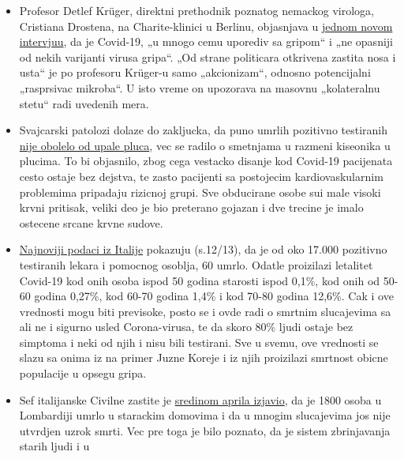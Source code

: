 \begin{itemize}
\tightlist
\item
  Profesor Detlef Krüger, direktni prethodnik poznatog nemackog
  virologa, Cristiana Drostena, na Charite-klinici u Berlinu, objasnjava
  u
  \href{https://de.sputniknews.com/interviews/20200425326953541-corona-gefahr-virologe/}{jednom
  novom intervjuu}, da je Covid-19, „u mnogo cemu uporediv sa gripom`` i
  „ne opasniji od nekih varijanti virusa gripa``. „Od strane politicara
  otkrivena zastita nosa i usta`` je po profesoru Krüger-u samo
  „akcionizam``, odnosno potencijalni „rasprsivac mikroba``. U isto
  vreme on upozorava na masovnu „kolateralnu stetu`` radi uvedenih mera.
\item
  Svajcarski patolozi dolaze do zakljucka, da puno umrlih pozitivno
  testiranih
  \href{https://www.welt.de/wissenschaft/article207417811/Corona-Tote-In-den-wenigsten-Faellen-eine-Lungenentzuendung.html}{nije
  obolelo od upale pluca}, vec se radilo o smetnjama u razmeni kiseonika
  u plucima. To bi objasnilo, zbog cega vestacko disanje kod Covid-19
  pacijenata cesto ostaje bez dejstva, te zasto pacijenti sa postojecim
  kardiovaskularnim problemima pripadaju rizicnoj grupi. Sve obducirane
  osobe sui male visoki krvni pritisak, veliki deo je bio preterano
  gojazan i dve trecine je imalo ostecene srcane krvne sudove.
\item
  \href{https://www.epicentro.iss.it/coronavirus/bollettino/Bollettino-sorveglianza-integrata-COVID-19_16-aprile-2020.pdf\#page=13}{Najnoviji
  podaci iz Italije} pokazuju (s.12/13), da je od oko 17.000 pozitivno
  testiranih lekara i pomocnog osoblja, 60 umrlo. Odatle proizilazi
  letalitet Covid-19 kod onih osoba ispod 50 godina starosti ispod
  0,1\%, kod onih od 50-60 godina 0,27\%, kod 60-70 godina 1,4\% i kod
  70-80 godina 12,6\%. Cak i ove vrednosti mogu biti previsoke, posto se
  i ovde radi o smrtnim slucajevima sa ali ne i sigurno usled
  Corona-virusa, te da skoro 80\% ljudi ostaje bez simptoma i neki od
  njih i nisu bili testirani. Sve u svemu, ove vrednosti se slazu sa
  onima iz na primer Juzne Koreje i iz njih proizilazi smrtnost obicne
  populacije u opsegu gripa.
\item
  Sef italijanske Civilne zastite je
  \href{https://www.theguardian.com/world/2020/apr/16/italian-police-broaden-care-home-coronavirus-milan}{sredinom
  aprila izjavio}, da je 1800 osoba u Lombardiji umrlo u starackim
  domovima i da u mnogim slucajevima jos nije utvrdjen uzrok smrti. Vec
  pre toga je bilo poznato, da je sistem zbrinjavanja starih ljudi i u

\end{itemize}
